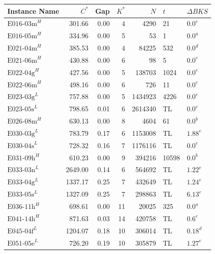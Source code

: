 \begin{table}[!ht]
	\centering
	\small
	\begin{tabular}{lrrrrll}
		\toprule
		Instance Name       & $C^*$   & Gap  & $K^*$ & $N$     & $t$   & $\Delta BKS$    \\
		\midrule
		$\text{E016-03m}^H$ & 301.66  & 0.00 & 4     & 4290    & 21    & $\text{0.0}^e$  \\
		$\text{E016-05m}^H$ & 334.96  & 0.00 & 5     & 53      & 1     & $\text{0.0}^a$  \\
		$\text{E021-04m}^H$ & 385.53  & 0.00 & 4     & 84225   & 532   & $\text{0.0}^d$  \\
		$\text{E021-06m}^H$ & 430.88  & 0.00 & 6     & 98      & 5     & $\text{0.0}^e$  \\
		$\text{E022-04g}^H$ & 427.56  & 0.00 & 5     & 138703  & 1024  & $\text{0.0}^e$  \\
		$\text{E022-06m}^H$ & 498.16  & 0.00 & 6     & 726     & 11    & $\text{0.0}^c$  \\
		$\text{E023-03g}^L$ & 757.88  & 0.00 & 5     & 1434923 & 4226  & $\text{0.0}^e$  \\
		$\text{E023-05s}^L$ & 798.65  & 0.01 & 6     & 2614340 & TL    & $\text{0.0}^e$  \\
		$\text{E026-08m}^H$ & 630.13  & 0.00 & 8     & 4604    & 61    & $\text{0.0}^b$  \\
		$\text{E030-03g}^L$ & 783.79  & 0.17 & 6     & 1153008 & TL    & $\text{1.88}^e$ \\
		$\text{E030-04s}^L$ & 728.32  & 0.16 & 7     & 1176116 & TL    & $\text{0.0}^e$  \\
		$\text{E031-09h}^H$ & 610.23  & 0.00 & 9     & 394216  & 10598 & $\text{0.0}^b$  \\
		$\text{E033-03n}^L$ & 2649.00 & 0.14 & 6     & 564692  & TL    & $\text{1.22}^e$ \\
		$\text{E033-04g}^L$ & 1337.17 & 0.25 & 7     & 432649  & TL    & $\text{1.24}^e$ \\
		$\text{E033-05s}^L$ & 1327.09 & 0.25 & 7     & 298863  & TL    & $\text{6.13}^e$ \\
		$\text{E036-11h}^H$ & 698.61  & 0.00 & 11    & 20025   & 325   & $\text{0.0}^a$  \\
		$\text{E041-14h}^H$ & 871.63  & 0.03 & 14    & 420758  & TL    & $\text{0.6}^c$  \\
		$\text{E045-04f}^L$ & 1204.07 & 0.18 & 10    & 306014  & TL    & $\text{0.18}^d$ \\
		$\text{E051-05e}^L$ & 726.20  & 0.19 & 10    & 305879  & TL    & $\text{1.27}^e$ \\

\end{tabular}
\end{table}
